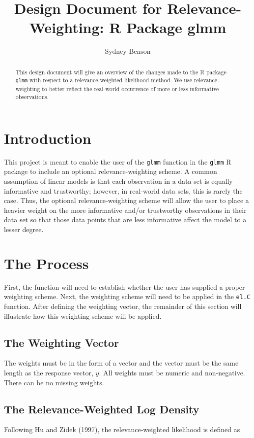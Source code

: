 \documentclass{article}
\title{Design Document for Relevance-Weighting: R Package glmm}
\author{Sydney Benson}
\begin{document}
\maketitle{}

\begin{abstract}
This design document will give an overview of the changes made to the R package \texttt{glmm} with respect to a relevance-weighted likelihood method. We use relevance-weighting to better reflect the real-world occurrence of more or less informative observations.
\end{abstract}

\section{Introduction}
This project is meant to enable the user of the \texttt{glmm} function in the \texttt{glmm} R package to include an optional relevance-weighting scheme. A common assumption of linear models is that each observation in a data set is equally informative and trustworthy; however, in real-world data sets, this is rarely the case. Thus, the optional relevance-weighting scheme will allow the user to place a heavier weight on the more informative and/or trustworthy observations in their data set so that those data points that are less informative affect the model to a lesser degree.

\section{The Process}
First, the function will need to establish whether the user has supplied a proper weighting scheme. Next, the weighting scheme will need to be applied in the \texttt{el.C} function. After defining the weighting vector, the remainder of this section will illustrate how this weighting scheme will be applied. 

\subsection{The Weighting Vector}
The weights must be in the form of a vector and the vector must be the same length as the response vector, $y$. All weights must be numeric and non-negative. There can be no missing weights. 

\subsection{The Relevance-Weighted Log Density}
Following Hu and Zidek (1997), the relevance-weighted likelihood is defined as
\end{document}
